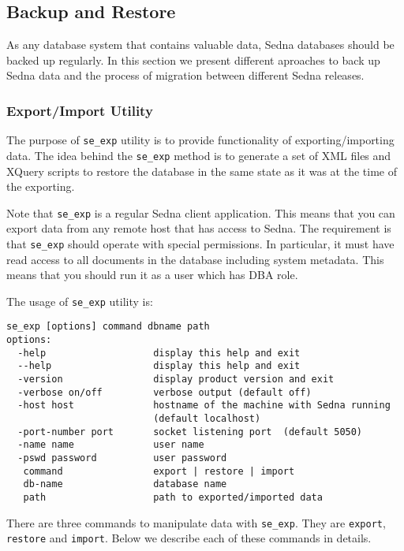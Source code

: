 \documentclass[a4paper,12pt]{article}
\begin{document}
\subsection{Backup and Restore}

As any database system that contains valuable data, Sedna databases should be backed up regularly.
In this section we present different aproaches to back up Sedna data and the process of
migration between different Sedna releases.


\subsubsection{Export/Import Utility}

The purpose of \verb!se_exp! utility is to provide functionality of exporting/importing data. The
idea behind the \verb!se_exp! method is to generate a set of XML files and XQuery
scripts to restore the database in the same state as it was at the time of the exporting.

Note that \verb!se_exp! is a regular Sedna client application. This means that you can export data from
any remote host that has access to Sedna. The requirement is that \verb!se_exp! should operate with
special permissions. In particular, it must have read access to all documents in the database including
system metadata. This means that you should run it as a user which has DBA role.

The usage of \verb!se_exp! utility is:

\begin{verbatim}
se_exp [options] command dbname path
options:
  -help                   display this help and exit
  --help                  display this help and exit
  -version                display product version and exit
  -verbose on/off         verbose output (default off)
  -host host              hostname of the machine with Sedna running
                          (default localhost)
  -port-number port       socket listening port  (default 5050)
  -name name              user name
  -pswd password          user password
   command                export | restore | import
   db-name                database name
   path                   path to exported/imported data
\end{verbatim}


There are three commands to manipulate data with \verb!se_exp!. They are \verb!export!,
\verb!restore! and \verb!import!. Below we describe each of these commands in details.
\end{document}
